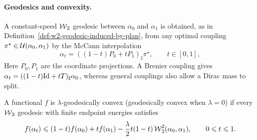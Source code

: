 \paragraph{Geodesics and convexity.}

A constant-speed $\operatorname{\mathcal{W}}_2$ geodesic between $\alpha_0$ and $\alpha_1$ is obtained, as in Definition~\ref{def-w2-geodesic-induced-by-plan}, from any optimal coupling $\pi^\star\in\mathcal{U}(\alpha_0,\alpha_1)$ by the McCann interpolation
\[
	\alpha_t=((1-t)P_0+tP_1)_\sharp\pi^\star,
	\qquad t\in[0,1],
\]
Here $P_0,P_1$ are the coordinate projections. A Brenier coupling gives $\alpha_t=((1-t)\mathrm{Id}+tT)_\sharp\alpha_0$, whereas general couplings also allow a Dirac mass to split.

\begin{defn}\label{def-geodesic-convexity}
	A functional $f$ is $\lambda$-geodesically convex (geodesically convex when $\lambda=0$) if every $\operatorname{\mathcal{W}}_2$ geodesic with finite endpoint energies satisfies
	\[
		f(\alpha_t)\leqslant (1-t)f(\alpha_0)+t f(\alpha_1)
		-\frac{\lambda}{2}t(1-t)\operatorname{\mathcal{W}}_2^2(\alpha_0,\alpha_1),
		\qquad 0\leqslant t\leqslant1.
	\]
\end{defn}

